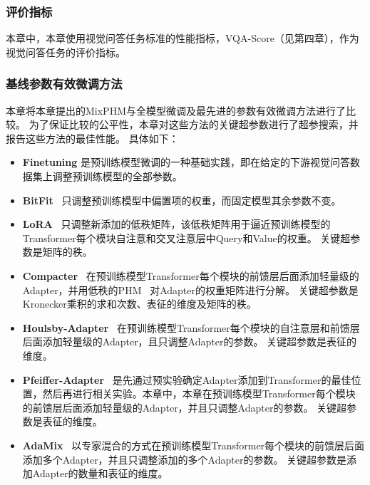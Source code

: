 \subsubsection{评价指标}
本章中，本章使用视觉问答任务标准的性能指标，VQA-Score（见第四章），作为视觉问答任务的评价指标。


\subsubsection{基线参数有效微调方法}
本章将本章提出的MixPHM与全模型微调及最先进的参数有效微调方法进行了比较。
为了保证比较的公平性，本章对这些方法的关键超参数进行了超参搜索，并报告这些方法的最佳性能。
具体如下：
\begin{itemize}
\item \textbf{Finetuning} 是预训练模型微调的一种基础实践，即在给定的下游视觉问答数据集上调整预训练模型的全部参数。 
\item \textbf{BitFit}~\cite{zaken2022bitfit} 只调整预训练模型中偏置项的权重，而固定模型其余参数不变。
\item \textbf{LoRA}~\cite{hu2022lora} 只调整新添加的低秩矩阵，该低秩矩阵用于逼近预训练模型的Transformer每个模块自注意和交叉注意层中Query和Value的权重。
关键超参数是矩阵的秩。
\item \textbf{Compacter}~\cite{karimi2021compacter} 在预训练模型Transformer每个模块的前馈层后面添加轻量级的Adapter，并用低秩的PHM~\cite{zhang2021beyond} 对Adapter的权重矩阵进行分解。
关键超参数是Kronecker乘积的求和次数、表征的维度及矩阵的秩。
\item \textbf{Houlsby-Adapter}~\cite{houlsby2019parameter} 在预训练模型Transformer每个模块的自注意层和前馈层后面添加轻量级的Adapter，且只调整Adapter的参数。
关键超参数是表征的维度。
\item \textbf{Pfeiffer-Adapter}~\cite{pfeiffer2020adapterfusion} 是先通过预实验确定Adapter添加到Transformer的最佳位置，然后再进行相关实验。本章中，本章在预训练模型Transformer每个模块的前馈层后面添加轻量级的Adapter，并且只调整Adapter的参数。
关键超参数是表征的维度。
\item \textbf{AdaMix}~\cite{wang2022adamix} 以专家混合的方式在预训练模型Transformer每个模块的前馈层后面添加多个Adapter，并且只调整添加的多个Adapter的参数。
关键超参数是添加Adapter的数量和表征的维度。
\end{itemize}



